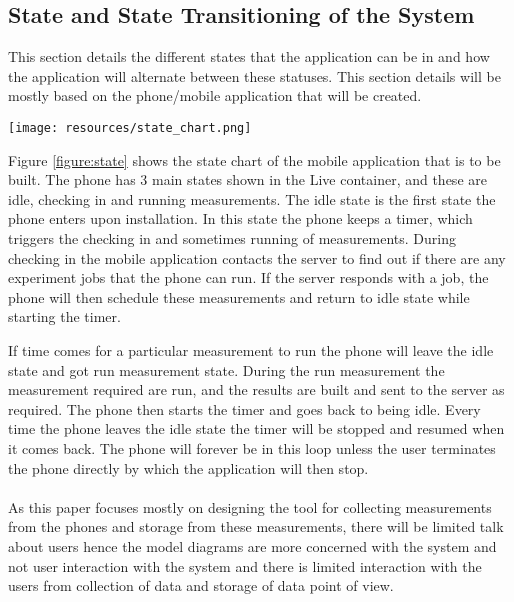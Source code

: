 \subsection{State and State Transitioning of the System}\label{subsec:state-and-state-transitioning-of-the-system}
This section details the different states that the application can be in and how the application will alternate between these statuses.
This section details will be mostly based on the phone/mobile application that will be created.
\begin{figure*}
    \begin{center}
        \texttt{[image: resources/state\_chart.png]}
    \end{center}
    \caption{Showing State Machine Chart for the mobile application that we will be building}
    \label{figure:state}
\end{figure*}
Figure \ref{figure:state}  shows the state chart of the mobile application that is to be built.
The phone has 3 main states shown in the Live container, and these are idle, checking in and running measurements.
The idle state is the first state the phone enters upon installation.
In this state the phone keeps a timer, which triggers the checking in and sometimes running of measurements.
During checking in the mobile application contacts the server to find out if there are any experiment jobs that the phone can run.
If the server responds with a job, the phone will then schedule these measurements and return to idle state while starting the timer.

If time comes for a particular measurement to run the phone will leave the idle state and got run measurement state.
During the run measurement the measurement required are run, and the results are built and sent to the server as required.
The phone then starts the timer and goes back to being idle.
Every time the phone leaves the idle state the timer will be stopped and resumed when it comes back.
The phone will forever be in this loop unless the user terminates the phone directly by which the application will then stop.
\paragraph{}
As this paper focuses mostly on designing the tool for collecting measurements from the phones and storage from these measurements, there will be limited talk about users hence the model diagrams are more concerned with the system and not user interaction with the system and there is limited interaction with the users from collection of data and storage of data point of view.